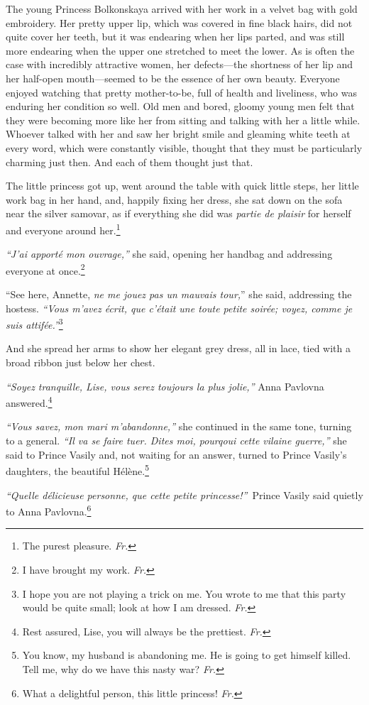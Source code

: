 The young Princess Bolkonskaya arrived with her work in a velvet bag
with gold embroidery. Her pretty upper lip, which was covered in fine
black hairs, did not quite cover her teeth, but it was endearing when
her lips parted, and was still more endearing when the upper one
stretched to meet the lower. As is often the case with incredibly
attractive women, her defects---the shortness of her lip and her
half-open mouth---seemed to be the essence of her own beauty. Everyone
enjoyed watching that pretty mother-to-be, full of health and
liveliness, who was enduring her condition so well. Old men and bored,
gloomy young men felt that they were becoming more like her from
sitting and talking with her a little while. Whoever talked with her
and saw her bright smile and gleaming white teeth at every word, which
were constantly visible, thought that they must be particularly charming
just then. And each of them thought just that.

The little princess got up, went around the table with quick little
steps, her little work bag in her hand, and, happily fixing her dress,
she sat down on the sofa near the silver samovar, as if everything she
did was \textit{partie de plaisir} for herself and everyone around
her.\footnote{The purest pleasure. \textit{Fr.}} 

\textit{``J'ai apport\'e mon ouvrage,''} she said, opening her handbag
and addressing everyone at once.\footnote{I have brought my
  work. \textit{Fr.}} %

``See here, Annette, \textit{ne me jouez pas un mauvais tour,}'' she
said, addressing the hostess. \textit{``Vous m'avez \'ecrit, que
  c'\'etait une toute petite soir\'ee; voyez, comme je suis
  attif\'ee.''}\footnote{I hope you are not playing a trick on me. You
  wrote to me that this party would be quite small; look at how I am
  dressed. \textit{Fr.}} %

And she spread her arms to show her elegant grey dress, all in lace,
tied with a broad ribbon just below her chest.

\textit{``Soyez tranquille, Lise, vous serez toujours la plus
  jolie,''} Anna Pavlovna answered.\footnote{Rest assured, Lise, you
  will always be the prettiest. \textit{Fr.}} %

\textit{``Vous savez, mon mari m'abandonne,''} she continued in the
same tone, turning to a general. \textit{``Il va se faire tuer. Dites
  moi, pourqoui cette vilaine guerre,''} she said to Prince Vasily
and, not waiting for an answer, turned to Prince Vasily's daughters,
the beautiful H\'el\`ene.\footnote{You know, my husband is abandoning
  me. He is going to get himself killed. Tell me, why do we have this
  nasty war? \textit{Fr.}} %

\textit{``Quelle d\'elicieuse personne, que cette petite
  princesse!''}~Prince Vasily said quietly to Anna
Pavlovna.\footnote{What a delightful person, this little princess!
  \textit{Fr.}} %

